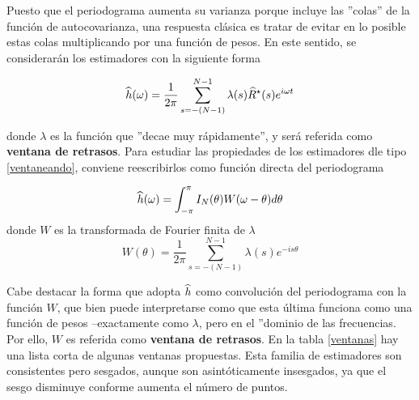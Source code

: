 Puesto que el periodograma aumenta su varianza porque incluye las ''colas'' de la 
funci\'on de
autocovarianza, una respuesta cl\'asica 
es tratar de evitar en lo posible estas
colas 
multiplicando por una funci\'on de pesos.
En este sentido, se considerar\'an los estimadores con la siguiente forma


\begin{equation}
\widehat{ h }(\omega) = \frac{1}{2\pi} \sum_{s = -(N-1)}^{N-1} 
\lambda(s) \widehat{ R }^{\star}(s) e^{i \omega t}
\label{ventaneando}
\end{equation}

donde $\lambda$ es la funci\'on que ''decae muy r\'apidamente'', y ser\'a referida como
\textbf{ventana de retrasos}. Para estudiar las propiedades de los estimadores
dle tipo \ref{ventaneando}, conviene reescribirlos como funci\'on directa del periodograma

\begin{equation*}
\widehat{ h }(\omega) = \int_{-\pi}^{\pi} I_N(\theta) W(\omega-\theta) d\theta
\end{equation*}
donde $W$ es la transformada de Fourier finita de $\lambda$
\begin{equation*}
W(\theta) = \frac{1}{2\pi} \sum_{s = -(N-1)}^{N-1} \lambda(s) e^{-is\theta}
\end{equation*}

Cabe destacar la forma que adopta $\widehat{ h }$ como convoluci\'on del periodograma con la funci\'on
$W$, que bien puede interpretarse como que esta \'ultima funciona como una funci\'on de pesos
--exactamente como $\lambda$, pero en el ''dominio de las frecuencias. Por ello, $W$ es
referida como \textbf{ventana de retrasos}.
En la tabla \ref{ventanas} hay una lista corta de algunas ventanas propuestas.
Esta familia de estimadores
son consistentes pero
sesgados, aunque son asint\'oticamente insesgados, ya que el sesgo disminuye conforme aumenta el
n\'umero de puntos.


